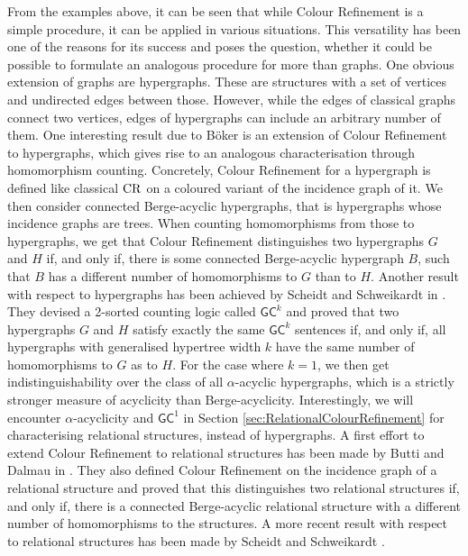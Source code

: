 From the examples above, it can be seen that while Colour Refinement is a simple procedure, it can be applied in various situations.
This versatility has been one of the reasons for its success and poses the question, whether it could be possible to formulate an analogous procedure for more than graphs.
One obvious extension of graphs are hypergraphs.
These are structures with a set of vertices and undirected edges between those.
However, while the edges of classical graphs connect two vertices, edges of hypergraphs can include an arbitrary number of them.
One interesting result due to Böker \cite{boker2019ColorRefinement} is an extension of Colour Refinement to hypergraphs, which gives rise to an analogous characterisation through homomorphism counting.
Concretely, Colour Refinement for a hypergraph is defined like classical $\operatorname{CR}$ on a coloured variant of the incidence graph of it.
We then consider connected Berge-acyclic hypergraphs, that is hypergraphs whose incidence graphs are trees. 
When counting homomorphisms from those to hypergraphs, we get that Colour Refinement distinguishes two hypergraphs $G$ and $H$ if, and only if, there is some connected Berge-acyclic hypergraph $B$, such that $B$ has a different number of homomorphisms to $G$ than to $H$.
Another result with respect to hypergraphs has been achieved by Scheidt and Schweikardt in \cite{scheidt2023CountingHomomorphisms}.
They devised a 2-sorted counting logic called $\mathsf{GC}^k$ and proved that two hypergraphs $G$ and $H$ satisfy exactly the same $\mathsf{GC}^k$ sentences if, and only if, all hypergraphs with generalised hypertree width $k$ have the same number of homomorphisms to $G$ as to $H$.
For the case where $k=1$, we then get indistinguishability over the class of all $\alpha$-acyclic hypergraphs, which is a strictly stronger measure of acyclicity than Berge-acyclicity.
Interestingly, we will encounter $\alpha$-acyclicity and $\mathsf{GC}^1$ in Section \ref{sec:RelationalColourRefinement} for characterising relational structures, instead of hypergraphs.
A first effort to extend Colour Refinement to relational structures has been made by Butti and Dalmau in \cite{butti2021FractionalHomomorphism}.
They also defined Colour Refinement on the incidence graph of a relational structure and proved that this distinguishes two relational structures if, and only if, there is a connected Berge-acyclic relational structure with a different number of homomorphisms to the structures.
A more recent result with respect to relational structures has been made by Scheidt and Schweikardt \cite{scheidt2025ColorRefinement}.
